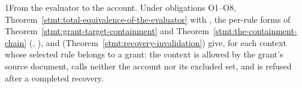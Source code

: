 \begin{perchproposition}{1}{From the evaluator to the account.}\label{stmt:from-the-evaluator-to-the-account}
Under obligations O1--O8, Theorem~\ref{stmt:total-equivalence-of-the-evaluator} with , the per-rule forms of Theorem~\ref{stmt:grant-target-containment} and Theorem~\ref{stmt:the-containment-chain} (, ), and  (Theorem~\ref{stmt:recovery-invalidation}) give, for each context whose selected rule belongs to a grant: the context is allowed by the grant's source document, calls neither the account nor its excluded set, and is refused after a completed recovery.
\end{perchproposition}
